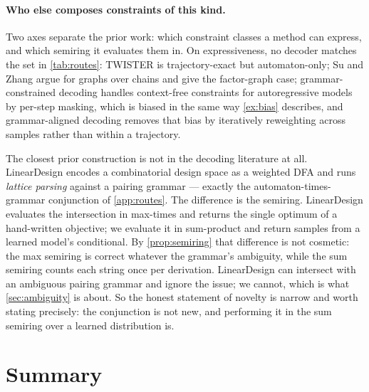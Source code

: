 \documentclass[11pt]{article}
\theoremstyle{definition}
\begin{document}
\paragraph{Who else composes constraints of this kind.}
Two axes separate the prior work: which constraint classes a method can express, and which semiring it
evaluates them in. On expressiveness, no decoder matches the set in \cref{tab:routes}: TWISTER
\cite{twister} is trajectory-exact but automaton-only; Su and Zhang \cite{sz26} argue for graphs over
chains and give the factor-graph case; grammar-constrained decoding \cite{geng2023} handles context-free
constraints for autoregressive models by per-step masking, which is biased in the same way
\cref{ex:bias} describes, and grammar-aligned decoding \cite{park2024} removes that bias by iteratively
reweighting across samples rather than within a trajectory.

The closest prior construction is not in the decoding literature at all. LinearDesign \cite{zhang2023}
encodes a combinatorial design space as a weighted DFA and runs \emph{lattice parsing} against a pairing
grammar --- exactly the automaton-times-grammar conjunction of \cref{app:routes}. The difference is the
semiring. LinearDesign evaluates the intersection in max-times and returns the single optimum of a
hand-written objective; we evaluate it in sum-product and return samples from a learned model's conditional. By
\cref{prop:semiring} that difference is not cosmetic: the max semiring is correct whatever the grammar's
ambiguity, while the sum semiring counts each string once per derivation. LinearDesign can intersect with
an ambiguous pairing grammar and ignore the issue; we cannot, which is what \cref{sec:ambiguity} is about.
So the honest statement of novelty is narrow and worth stating precisely: the conjunction is not new, and
performing it in the sum semiring over a learned distribution is.

\section{Summary}\label{sec:summary}
\end{document}
